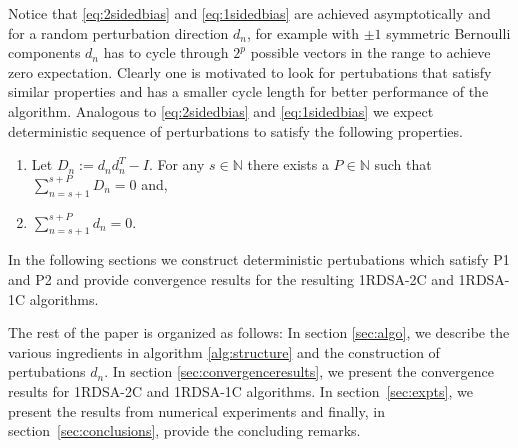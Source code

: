 \documentclass[letterpaper, 10 pt, conference]{ieeeconf}  %
\begin{document}
Notice that \eqref{eq:2sidedbias} and \eqref{eq:1sidedbias} are achieved asymptotically and 
for a random perturbation direction $d_n$, for example with $\pm 1$ symmetric Bernoulli 
components $d_n$ has to cycle through $2^p$ possible vectors in the range to achieve zero
expectation. Clearly one is motivated to look for pertubations that satisfy similar 
properties and has a smaller cycle length for better performance of the algorithm. 
Analogous to \eqref{eq:2sidedbias} and \eqref{eq:1sidedbias} we expect deterministic sequence 
of perturbations to satisfy the following properties.
\begin{enumerate}[label=\textbf{P\arabic*}.]
  \item Let $D_n:=d_nd_n^T-I.$ For any $s \in \mathbb{N}$ there exists a 
  $P \in \mathbb{N}$ such that $\sum\limits_{n=s+1}^{s+P}D_n=0$ and,
  \item  $\sum\limits_{n=s+1}^{s+P}d_n=0.$
\end{enumerate}
In the following sections we construct deterministic pertubations which satisfy P1 and P2
and provide convergence results for the resulting 1RDSA-2C and 1RDSA-1C algorithms.

The rest of the paper is organized as follows: In section \ref{sec:algo}, we
describe the various ingredients in algorithm \ref{alg:structure} and the construction
of pertubations $d_n$.
In section \ref{sec:convergenceresults}, 
we present the convergence results for 1RDSA-2C and 1RDSA-1C algorithms.
In section~\ref{sec:expts}, we present the results from numerical experiments and finally, 
in section~\ref{sec:conclusions}, provide the concluding remarks.
\end{document}
